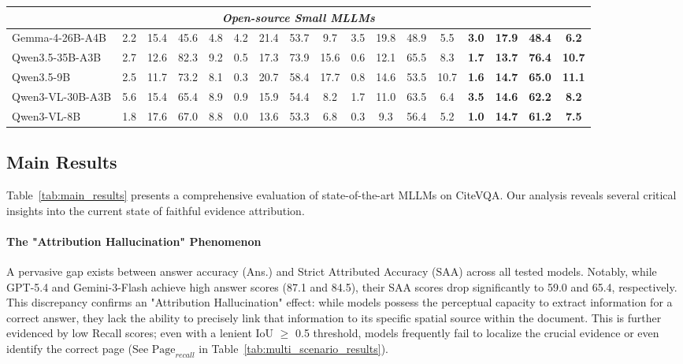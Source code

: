 \documentclass[]{opendatalab}
\begin{document}
{\begin{table}[t]
\begin{tabular}{@{}l cccc cccc cccc >{\bfseries}c>{\bfseries}c>{\bfseries}c>{\bfseries}c@{}}
\multicolumn{17}{c}{\textit{Open-source Small MLLMs}} \\ \midrule
Gemma-4-26B-A4B &2.2&15.4&45.6&4.8&4.2&21.4&53.7&9.7&3.5&19.8&48.9&5.5&3.0&17.9&48.4&6.2 \\
Qwen3.5-35B-A3B &2.7&12.6&82.3&9.2&0.5&17.3&73.9&15.6&0.6&12.1&65.5&8.3&1.7&13.7&76.4&10.7 \\
Qwen3.5-9B&2.5&11.7&73.2&8.1&0.3&20.7&58.4&17.7&0.8&14.6&53.5&10.7&1.6&14.7&65.0&11.1 \\
Qwen3-VL-30B-A3B &5.6&15.4&65.4&8.9&0.9&15.9&54.4&8.2&1.7&11.0&63.5&6.4&3.5&14.6&62.2&8.2\\
Qwen3-VL-8B &1.8&17.6&67.0&8.8&0.0&13.6&53.3&6.8&0.3&9.3&56.4&5.2&1.0&14.7&61.2&7.5 \\

\bottomrule
\end{tabular}
\end{table}


\subsection{Main Results}
Table~\ref{tab:main_results} presents a comprehensive evaluation of state-of-the-art MLLMs on CiteVQA. Our analysis reveals several critical insights into the current state of faithful evidence attribution.

\paragraph{The "Attribution Hallucination" Phenomenon} A pervasive gap exists between answer accuracy (Ans.) and Strict Attributed Accuracy (SAA) across all tested models. Notably, while GPT-5.4 and Gemini-3-Flash achieve high answer scores (87.1 and 84.5), their SAA scores drop significantly to 59.0 and 65.4, respectively. This discrepancy confirms an "Attribution Hallucination" effect: while models possess the perceptual capacity to extract information for a correct answer, they lack the ability to precisely link that information to its specific spatial source within the document. This is further evidenced by low Recall scores; even with a lenient IoU $\ge$ 0.5 threshold, models frequently fail to localize the crucial evidence or even identify the correct page (See $\text{Page}_{recall}$ in Table~\ref{tab:multi_scenario_results}).

}
\end{document}
